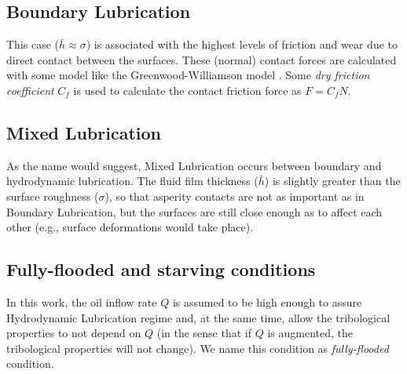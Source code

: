 \subsection{Boundary Lubrication} This case ($\bar{h}\approx \sigma$) is associated with the highest levels of friction and wear due to direct contact between the surfaces. These (normal) contact forces are calculated with some model like the Greenwood-Williamson model \cite{greenwood1966,panayi08}. Some \emph{dry friction coefficient} $C_f$ is used to calculate the contact friction force as $F=C_fN$.

\subsection{Mixed Lubrication}
As the name would suggest, Mixed Lubrication occurs between boundary and hydrodynamic lubrication. The fluid film thickness ($\bar{h}$) is slightly greater than the surface roughness ($\sigma$), so that asperity contacts are not as important as in Boundary Lubrication, but the surfaces are still close enough as to affect each other (e.g., surface deformations would take place). %

\subsection{Fully-flooded and starving conditions}
\label{sec:fully-flooded} In this work, the oil inflow rate $Q$ is assumed to be high enough to assure Hydrodynamic Lubrication regime and, at the same time, allow the tribological properties to not depend on $Q$ (in the sense that if $Q$ is augmented, the tribological properties will not change). We name this condition as \emph{fully-flooded} condition.

